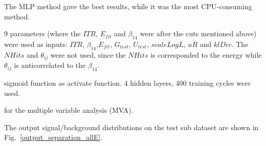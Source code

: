 The MLP method gave the best results, while it was the most CPU-consuming method.

9 parameters (where the $ITR$, $E_{fit}$ and $\beta_{14}$ were after the cuts mentioned above) were used as inputs: $ITR$, $\beta_{14}$,$E_{fit}$,  $G_{test}$, $U_{test}$, $scaleLogL$, $u\dot R$ and $klDiv$. The $NHits$ and $\theta_{ij}$ were not used, since the $NHits$ is corresponded to the energy while $\theta_{ij}$ is anticorrelated to the $\beta_{14}$.

sigmoid function as activate function.
4 hidden layers, 400 training cycles were used.





 for the multiple variable analysis (MVA).

The output signal/background distributions on the test sub dataset are shown in Fig.~\ref{output_separation_allE}.
